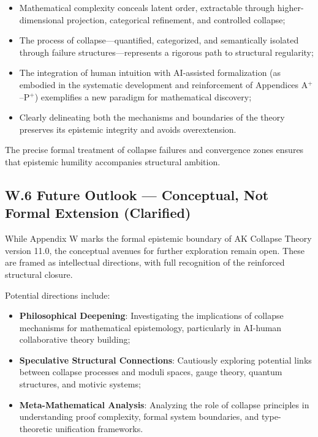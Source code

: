 \documentclass[11pt]{article}
\begin{document}
\begin{itemize}
    \item Mathematical complexity conceals latent order, extractable through higher-dimensional projection, categorical refinement, and controlled collapse;
    \item The process of collapse—quantified, categorized, and semantically isolated through failure structures—represents a rigorous path to structural regularity;
    \item The integration of human intuition with AI-assisted formalization (as embodied in the systematic development and reinforcement of Appendices A$^{+}$–P$^{+}$) exemplifies a new paradigm for mathematical discovery;
    \item Clearly delineating both the mechanisms and boundaries of the theory preserves its epistemic integrity and avoids overextension.
\end{itemize}

The precise formal treatment of collapse failures and convergence zones ensures that epistemic humility accompanies structural ambition.

\subsection*{W.6 Future Outlook — Conceptual, Not Formal Extension (Clarified)}

While Appendix W marks the formal epistemic boundary of AK Collapse Theory version 11.0, the conceptual avenues for further exploration remain open. These are framed as intellectual directions, with full recognition of the reinforced structural closure.

Potential directions include:

\begin{itemize}
    \item \textbf{Philosophical Deepening}: Investigating the implications of collapse mechanisms for mathematical epistemology, particularly in AI-human collaborative theory building;
    \item \textbf{Speculative Structural Connections}: Cautiously exploring potential links between collapse processes and moduli spaces, gauge theory, quantum structures, and motivic systems;
    \item \textbf{Meta-Mathematical Analysis}: Analyzing the role of collapse principles in understanding proof complexity, formal system boundaries, and type-theoretic unification frameworks.
\end{itemize}
\end{document}
